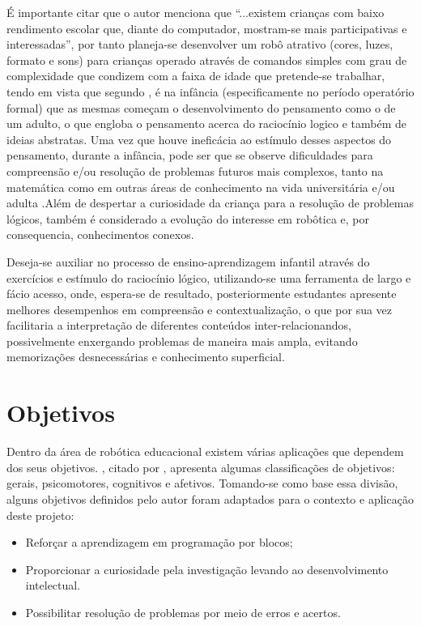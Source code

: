 É importante citar que o autor  menciona que “...existem crianças com baixo rendimento escolar
que, diante do computador, mostram-se mais participativas e interessadas”, por tanto planeja-se desenvolver um robô
atrativo (cores, luzes, formato e sons) para crianças operado através de comandos simples com grau de complexidade
que condizem com a faixa de idade que pretende-se trabalhar, tendo em vista que segundo ,
é na infância (especificamente no período operatório formal) que as mesmas começam o desenvolvimento do pensamento
como o de um adulto, o que engloba o pensamento acerca do raciocínio logico e também de ideias abstratas. Uma vez
que houve ineficácia ao estímulo desses aspectos do pensamento, durante a infância, pode ser que se observe
dificuldades para compreensão e/ou resolução de problemas futuros mais complexos, tanto na matemática como em
outras áreas de conhecimento na vida universitária e/ou adulta \cite{rauber:2003}.Além de despertar a curiosidade
da criança para a resolução de problemas lógicos, também é considerado a evolução do interesse em robôtica e, por
consequencia, conhecimentos conexos.

Deseja-se auxiliar no processo de ensino-aprendizagem infantil através do exercícios e estímulo do raciocínio lógico,
utilizando-se uma ferramenta de largo e fácio acesso, onde, espera-se de resultado, posteriormente estudantes
apresente melhores desempenhos em compreensão e contextualização, o que por sua vez facilitaria a interpretação
de diferentes conteúdos inter-relacionandos, possivelmente enxergando problemas de maneira mais ampla, evitando
memorizações desnecessárias e conhecimento superficial.

\section{Objetivos}
Dentro da área de robótica educacional existem várias aplicações que dependem dos seus objetivos. ,
citado por , apresenta algumas classificações de objetivos: gerais, psicomotores, cognitivos e
afetivos. Tomando-se como base essa divisão, alguns objetivos definidos pelo autor foram adaptados para o contexto e
aplicação deste projeto:
\begin{itemize}
	\item Reforçar a aprendizagem em programação por blocos;
	\item Proporcionar a curiosidade pela investigação levando ao desenvolvimento intelectual.
	\item Possibilitar resolução de problemas por meio de erros e acertos.
\end{itemize}

